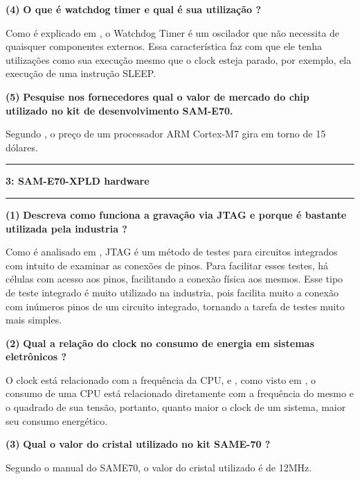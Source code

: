 \documentclass[11pt]{article}
\newcommand\question[2]{\vspace{.25in}\hrule\textbf{#1: #2}\vspace{.5em}\hrule\vspace{.10in}}
\renewcommand\part[1]{\vspace{.10in}\textbf{(#1)}}
\newcommand\watchdog{\vspace{.10in}\textbf{O que é watchdog timer e qual é sua utilização ?}}
\newcommand\custo{\vspace{.10in}\textbf{Pesquise nos fornecedores qual o valor de mercado do chip
		utilizado no kit de desenvolvimento SAM-E70.}}
\newcommand\jtag{\vspace{.10in}\textbf{Descreva como funciona a gravação via JTAG e porque é
		bastante utilizada pela industria ?}}
\newcommand\clock{\vspace{.10in}\textbf{Qual a relação do clock no consumo de energia em sistemas
		eletrônicos ?}}
\newcommand\cristal{\vspace{.10in}\textbf{Qual o valor do cristal utilizado no kit SAME-70 ?}}
\begin{document}
\raggedright
\part{4}
\watchdog

\RaggedRight
Como é explicado em \cite{watchdog}, o Watchdog Timer é um oscilador que não necessita de quaisquer componentes externos. Essa característica faz com que ele tenha utilizações como sua execução mesmo que o clock esteja parado, por exemplo, ela execução de uma instrução SLEEP.

\raggedright
\part{5}
\custo

\RaggedRight
Segundo \cite{cortexm7}, o preço de um processador ARM Cortex-M7 gira em torno de 15 dólares.

\raggedright
\question{3}{SAM-E70-XPLD hardware}

\raggedright
\part{1}
\jtag

\RaggedRight
Como é analisado em \cite{jtag}, JTAG é um método de testes para circuitos integrados com intuito de examinar as conexões de pinos. Para facilitar esses testes, há células com acesso aos pinos, facilitando a conexão física aos mesmos. Esse tipo de teste integrado é muito utilizado na industria, pois facilita muito a conexão com inúmeros pinos de um circuito integrado, tornando a tarefa de testes muito mais simples.

\raggedright
\part{2}
\clock

\RaggedRight
O clock está relacionado com a frequência da CPU, e , como visto em \cite{clock_energy}, o consumo de uma CPU está relacionado diretamente com a frequência do mesmo e o quadrado de sua tensão, portanto, quanto maior o clock de um sistema, maior seu consumo energético.

\raggedright
\part{3}
\cristal

\RaggedRight
Segundo o manual do SAME70, o valor do cristal utilizado é de 12MHz.
\end{document}
